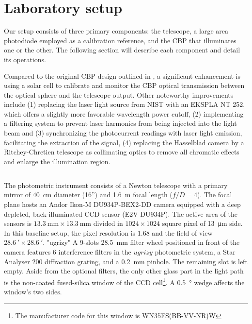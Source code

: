 \section{Laboratory setup}
\label{sec:setup}

Our setup consists of three primary components: the \SD telescope, a large area photodiode employed as a calibration reference, and the CBP
that illuminates one or the other. The following section will describe each component and detail its operations.

Compared to the original CBP design outlined in \cite{Mondrik_2023}, a significant enhancement is using a solar cell to calibrate and monitor the CBP optical transmission between the optical sphere and the telescope output. Other noteworthy improvements include (1) replacing the laser light source from NIST with an EKSPLA NT 252, which offers a slightly more favorable wavelength power cutoff, (2) implementing a filtering system to prevent laser harmonics from being injected into the light beam and (3) synchronizing the photocurrent readings with laser light emission, facilitating the extraction of the signal, (4) replacing the Hasselblad camera by a Ritchey-Chretien telescope as collimating optics to remove all chromatic effects and enlarge the illumination region.	

\subsection{\SD}
\label{sec:stardice}

The \SD photometric instrument consists of a Newton telescope with a primary mirror of \SI{40}{\centi\meter} diameter (16'') and \SI{1.6}{\meter} focal length ($f/D = 4$). The focal plane hosts an Andor Ikon-M DU934P-BEX2-DD camera equipped with a deep depleted, back-illuminated CCD sensor (E2V DU934P). The active area of the sensors is $\SI{13.3}{\milli\meter}\times\SI{13.3}{\milli\meter}$ divided in $1024\times 1024$ square pixel of \SI{13}{\micro\meter} side. In this baseline setup, the pixel resolution is \SI{1.68}{\arcsec} and the field of view $\SI{28.6}{\arcmin}\times\SI{28.6}{\arcmin}$.
"ugrizy"
A 9-slots \SI{28.5}{\milli\meter} filter wheel positioned in front of the camera features 6 interference filters in the $ugrizy$ photometric system, a Star Analyser 200 diffraction grating, and a \SI{0.2}{\milli\meter} pinhole. The remaining slot is left empty. Aside from the optional filters, the only other glass part in the light path is the non-coated fused-silica window of the CCD cell\footnote{The manufacturer code for this window is WN35FS(BB-VV-NR)W}. A \SI{0.5}{\degree} wedge affects the window's two sides.


